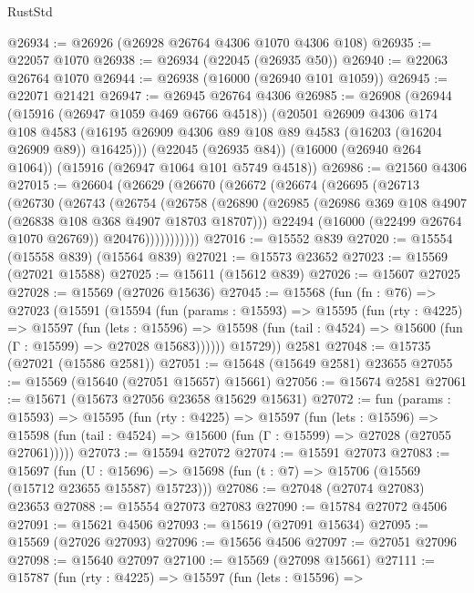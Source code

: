 \begin{lexlean}{RustStd}
\begin{coremodule}
@26934 := @26926 (@26928 @26764 @4306 @1070 @4306 @108)
@26935 := @22057 @1070
@26938 := @26934 (@22045 (@26935 @50))
@26940 := @22063 @26764 @1070
@26944 := @26938 (@16000 (@26940 @101 @1059))
@26945 := @22071 @21421
@26947 := @26945 @26764 @4306
@26985 := @26908
    (@26944
      (@15916 (@26947 @1059 @469 @6766 @4518))
      (@20501
        @26909
        @4306
        @174
        @108
        @4583
        (@16195 @26909 @4306 @89 @108 @89 @4583 (@16203 (@16204 @26909 @89)) @16425)))
    (@22045 (@26935 @84))
    (@16000 (@26940 @264 @1064))
    (@15916 (@26947 @1064 @101 @5749 @4518))
@26986 := @21560 @4306
@27015 := @26604
    (@26629
      (@26670
        (@26672
          (@26674
            (@26695
              (@26713
                (@26730
                  (@26743
                    (@26754
                      (@26758
                        (@26890
                          (@26985 (@26986 @369 @108 @4907 (@26838 @108 @368 @4907 @18703 @18707)))
                          @22494
                          (@16000 (@22499 @26764 @1070 @26769))
                          @20476)))))))))))
@27016 := @15552 @839
@27020 := @15554 (@15558 @839) (@15564 @839)
@27021 := @15573 @23652
@27023 := @15569 (@27021 @15588)
@27025 := @15611 (@15612 @839)
@27026 := @15607 @27025
@27028 := @15569 (@27026 @15636)
@27045 := @15568
    (fun (fn : @76) =>
    @27023
      (@15591
        (@15594
          (fun (params : @15593) =>
          @15595
            (fun (rty : @4225) =>
            @15597
              (fun (lets : @15596) =>
              @15598 (fun (tail : @4524) => @15600 (fun (Γ : @15599) => @27028 @15683))))))
        @15729))
    @2581
@27048 := @15735 (@27021 (@15586 @2581))
@27051 := @15648 (@15649 @2581) @23655
@27055 := @15569 (@15640 (@27051 @15657) @15661)
@27056 := @15674 @2581
@27061 := @15671 (@15673 @27056 @23658 @15629 @15631)
@27072 := fun (params : @15593) =>
  @15595
    (fun (rty : @4225) =>
    @15597
      (fun (lets : @15596) =>
      @15598 (fun (tail : @4524) => @15600 (fun (Γ : @15599) => @27028 (@27055 @27061)))))
@27073 := @15594 @27072
@27074 := @15591 @27073
@27083 := @15697
    (fun (U : @15696) => @15698 (fun (t : @7) => @15706 (@15569 (@15712 @23655 @15587) @15723)))
@27086 := @27048 (@27074 @27083) @23653
@27088 := @15554 @27073 @27083
@27090 := @15784 @27072 @4506
@27091 := @15621 @4506
@27093 := @15619 (@27091 @15634)
@27095 := @15569 (@27026 @27093)
@27096 := @15656 @4506
@27097 := @27051 @27096
@27098 := @15640 @27097
@27100 := @15569 (@27098 @15661)
@27111 := @15787
    (fun (rty : @4225) =>
    @15597
      (fun (lets : @15596) =>

\end{coremodule}
\end{lexlean}
